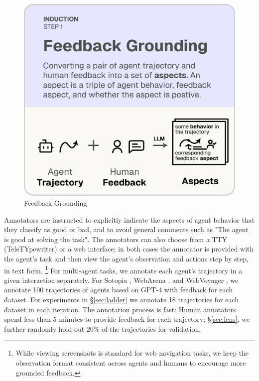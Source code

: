 \begin{figure}
  \vspace{-15pt}
  \includegraphics[width=\linewidth]{figs/autolibra_step_1.pdf}
  \vspace{-10pt}
  \caption{Feedback Grounding}
  \label{fig:feedback_grounding}
\end{figure}
Annotators are instructed to explicitly indicate the aspects of agent behavior that they classify as good or bad,
and to avoid general comments such as \textsf{"The agent is good at solving the task"}.
The annotators can also choose from a TTY (TeleTYpewriter) or a web interface; in both cases the annotator is provided with the agent's task
and then view the agent's observation and actions step by step, in text form. \footnote{While viewing screenshots is standard for web navigation tasks, we keep the observation format consistent across agents and humans to encourage more grounded feedback.}
For multi-agent tasks, we annotate each agent's trajectory in a given interaction separately. For Sotopia \citep{zhousotopia}, WebArena \citep{zhouwebarena},
and WebVoyager \citep{he2024webvoyager}, we annotate 100 trajectories of agents based on GPT-4 \citep{achiam2023gpt} with feedback for each dataset. For experiments in \S\ref{sec:ladder} we annotate 18 trajectories for each dataset in each
iteration. The annotation process is fast: Human annotators spend less than 5 minutes to provide feedback for each trajectory; \S\ref{sec:lens}, we further randomly hold out 20\% of the trajectories for validation.


